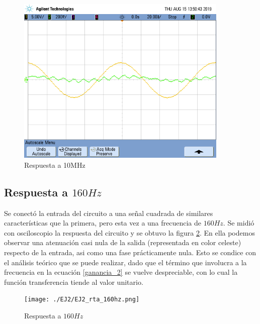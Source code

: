  \begin{figure}[H]
    \centering
    \includegraphics[width=0.9\textwidth]{./EJ2/EJ2_rta_alta_frec.png}
    \caption{Respuesta a 10MHz}
    \label{fig:noise_2}
\end{figure}
 
\subsection{Respuesta a $160Hz$}

\quad \quad Se conect\'o la entrada del circuito a una se\~nal cuadrada de similares caracter\'isticas que la primera, pero esta vez a una frecuencia de $160Hz$. Se midi\'o con osciloscopio la respuesta del circuito y se obtuvo la figura \ref{fig:160hz_2}. En ella podemos observar una atenuaci\'on casi nula de la salida (representada en color celeste) respecto de la entrada, asi como una fase pr\'acticamente nula. Esto se condice con el an\'alisis te\'orico que se puede realizar, dado que el t\'ermino que involucra a la frecuencia en la ecuaci\'on \ref{ganancia_2} se vuelve despreciable, con lo cual la funci\'on transferencia tiende al valor unitario.

\begin{figure}[H]
    \centering
    \texttt{[image: ./EJ2/EJ2\_rta\_160hz.png]}
    \caption{Respuesta a $160Hz$}
    \label{fig:160hz_2} 
\end{figure}

